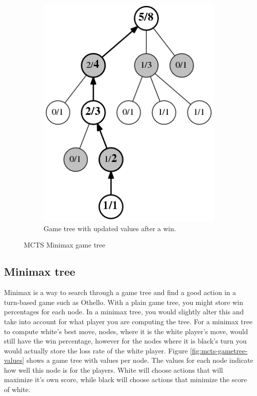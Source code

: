 \documentclass[
11pt, %
english, %
singlespacing, %
headsepline, %
]{MastersDoctoralThesis} %
\begin{document}
\begin{figure}[t]
\begin{subfigure}{0.3\textwidth}
		\includegraphics[width=\textwidth]{images/gametree-values-updated}
		\caption{Game tree with updated values after a win.}
		\label{fig:mcts-gametree-values-updated}
	\end{subfigure}
	\caption{MCTS Minimax game tree}
\end{figure}

\subsection{Minimax tree}
Minimax is a way to search through a game tree and find a good action in a turn-based game such as Othello. With a plain game tree, you might store win percentages for each node. In a minimax tree, you would slightly alter this and take into account for what player you are computing the tree. For a minimax tree to compute white's best move, nodes, where it is the white player's move, would still have the win percentage, however for the nodes where it is black's turn you would actually store the loss rate of the white player. Figure \ref{fig:mcts-gametree-values} shows a game tree with values per node. The values for each node indicate how well this node is for the players. White will choose actions that will maximize it's own score, while black will choose actions that minimize the score of white.
\end{document}
